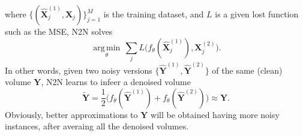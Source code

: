 where $\{(\hat{\mathbf X}_j^{(1)}, {\mathbf X}_j)\}_{j=1}^M$ is the training
dataset, and $L$ is a given lost function such as the MSE, N2N solves
\begin{equation}
  \underset{\theta}{\operatorname{arg\,min}} \, \sum_j L \big(f_\theta(\hat{\mathbf X}_j^{(1)}), {\mathbf X}_j^{(2)}\big).
\end{equation}
In other words, given two noisy versions
$\{\hat{\mathbf Y}^{(1)}, \hat{\mathbf Y}^{(2)}\}$ of the same (clean)
volume ${\mathbf Y}$, N2N learns to infeer a denoised volume
\begin{equation}
  \tilde{\mathbf Y}=\frac{1}{2}\big(f_\theta(\hat{\mathbf Y}^{(1)})+f_\theta(\hat{\mathbf Y}^{(2)})\big)\approx{\mathbf Y}.
\end{equation}
Obviously, better approximations to ${\mathbf Y}$ will be obtained
having more noisy instances, after averaing all the denoised volumes.

